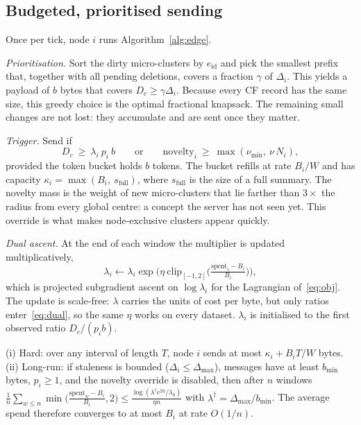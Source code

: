 \subsection{Budgeted, prioritised sending}\label{sec:policy}
Once per tick, node $i$ runs Algorithm~\ref{alg:edge}.

\emph{Prioritisation.} Sort the dirty micro-clusters by $e_{\mathrm{id}}$ and pick the smallest prefix that, together with all pending deletions, covers a fraction $\gamma$ of $\Delta_i$. This yields a payload of $b$ bytes that covers $D_c\ge\gamma\Delta_i$. Because every CF record has the same size, this greedy choice is the optimal fractional knapsack. The remaining small changes are not lost: they accumulate and are sent once they matter.

\emph{Trigger.} Send if
\begin{equation}\label{eq:trigger}
D_c\ \ge\ \lambda_i\ p_i\ b\qquad\text{or}\qquad \text{novelty}_i\ \ge\ \max(\nu_\text{min},\ \nu\,N_i),
\end{equation}
provided the token bucket holds $b$ tokens. The bucket refills at rate $B_i/W$ and has capacity $\kappa_i=\max(B_i,\ s_\text{full})$, where $s_\text{full}$ is the size of a full summary. The novelty mass is the weight of new micro-clusters that lie farther than $3\times$ the radius from every global centre: a concept the server has not seen yet. This override is what makes node-exclusive clusters appear quickly.

\emph{Dual ascent.} At the end of each window the multiplier is updated multiplicatively,
\begin{equation}\label{eq:dual}
\lambda_i\leftarrow\lambda_i\exp\!\Big(\eta\ \mathrm{clip}_{[-1,2]}\big(\tfrac{\text{spent}_i-B_i}{B_i}\big)\Big),
\end{equation}
which is projected subgradient ascent on $\log\lambda_i$ for the Lagrangian of~\eqref{eq:obj}. The update is scale-free: $\lambda$ carries the units of cost per byte, but only ratios enter~\eqref{eq:dual}, so the same $\eta$ works on every dataset. $\lambda_i$ is initialised to the first observed ratio $D_c/(p_ib)$.

\begin{proposition}[Budget]\label{prop:budget}
(i) Hard: over any interval of length $T$, node $i$ sends at most $\kappa_i+B_iT/W$ bytes. (ii) Long-run: if staleness is bounded ($\Delta_i\le\Delta_\text{max}$), messages have at least $b_\text{min}$ bytes, $p_i\ge1$, and the novelty override is disabled, then after $n$ windows $\frac1n\sum_{w\le n}\min\!\big(\frac{\text{spent}_w-B_i}{B_i},2\big)\le\frac{\log(\lambda^\dagger e^{2\eta}/\lambda_0)}{\eta n}$ with $\lambda^\dagger=\Delta_\text{max}/b_\text{min}$. The average spend therefore converges to at most $B_i$ at rate $O(1/n)$.
\end{proposition}

